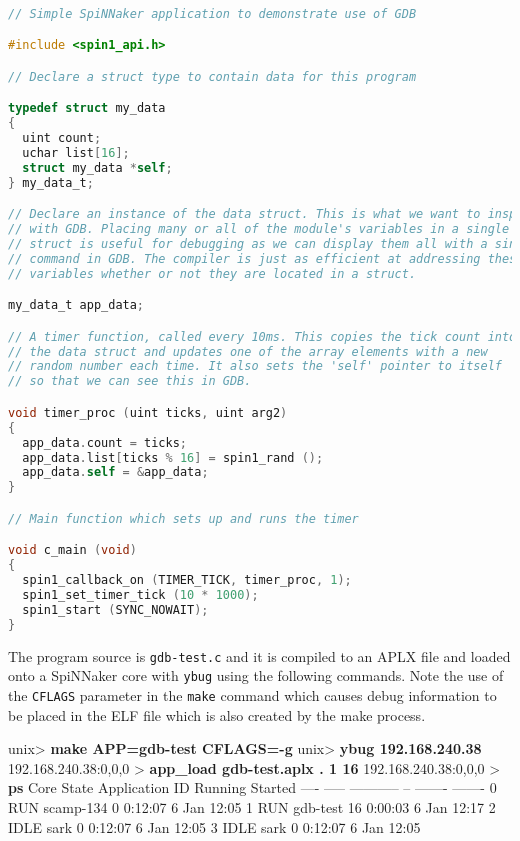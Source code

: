 \begin{lstlisting}[language=C]

// Simple SpiNNaker application to demonstrate use of GDB

#include <spin1_api.h>

// Declare a struct type to contain data for this program

typedef struct my_data
{
  uint count;
  uchar list[16];
  struct my_data *self;
} my_data_t;

// Declare an instance of the data struct. This is what we want to inspect
// with GDB. Placing many or all of the module's variables in a single
// struct is useful for debugging as we can display them all with a single
// command in GDB. The compiler is just as efficient at addressing these
// variables whether or not they are located in a struct.

my_data_t app_data;

// A timer function, called every 10ms. This copies the tick count into
// the data struct and updates one of the array elements with a new
// random number each time. It also sets the 'self' pointer to itself
// so that we can see this in GDB.

void timer_proc (uint ticks, uint arg2)
{
  app_data.count = ticks;
  app_data.list[ticks % 16] = spin1_rand ();
  app_data.self = &app_data;
}

// Main function which sets up and runs the timer

void c_main (void)
{
  spin1_callback_on (TIMER_TICK, timer_proc, 1);
  spin1_set_timer_tick (10 * 1000);
  spin1_start (SYNC_NOWAIT);
}
\end{lstlisting}

The program source is \texttt{gdb-test.c} and it is compiled to an APLX
file and loaded onto a SpiNNaker core with \texttt{ybug} using the
following commands. Note the use of the \texttt{CFLAGS} parameter in
the \texttt{make} command which causes debug information to be placed
in the ELF file which is also created by the make process.

\begin{shell}
unix> \textbf{make APP=gdb-test CFLAGS=-g}
unix> \textbf{ybug 192.168.240.38}
192.168.240.38:0,0,0 > \textbf{app_load gdb-test.aplx . 1 16}
192.168.240.38:0,0,0 > \textbf{ps}
Core State  Application       ID   Running  Started
---- -----  -----------       --   -------  -------
  0  RUN    scamp-134          0   0:12:07   6 Jan 12:05
  1  RUN    gdb-test          16   0:00:03   6 Jan 12:17
  2  IDLE   sark               0   0:12:07   6 Jan 12:05
  3  IDLE   sark               0   0:12:07   6 Jan 12:05
\end{shell}

